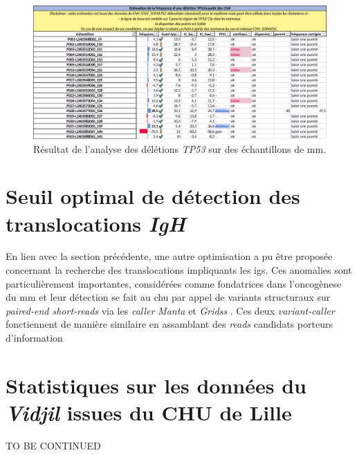 \begin{figure}[H]
    \centering
    \includegraphics[width=1\textwidth]{images/excel_tp53.png}
    \caption{Résultat de l'analyse des délétions \textit{TP53} sur des échantillons de \gls{mm}.}
    \label{fig:excel-tp53}
\end{figure}

\section{Seuil optimal de détection des translocations \textit{IgH}}

En lien avec la section précédente, une autre optimisation a pu être proposée concernant la recherche des translocations impliquants les \glspl{ig}.
Ces anomalies sont particulièrement importantes, considérées comme fondatrices dans l'oncogènese du \gls{mm} et leur détection se fait au \gls{chu} 
par appel de variants structuraux sur \textit{paired-end short-reads} via les \textit{caller} \textit{Manta} \cite{chenMantaRapidDetection2016a} et 
\textit{Gridss} \cite{cameronGRIDSSSensitiveSpecific2017a}. Ces deux \textit{variant-caller} fonctiennent de manière similaire en assamblant des \textit{reads} 
candidats porteurs d'information


\section{Statistiques sur les données du \textit{Vidjil} issues du CHU de Lille}

TO BE CONTINUED